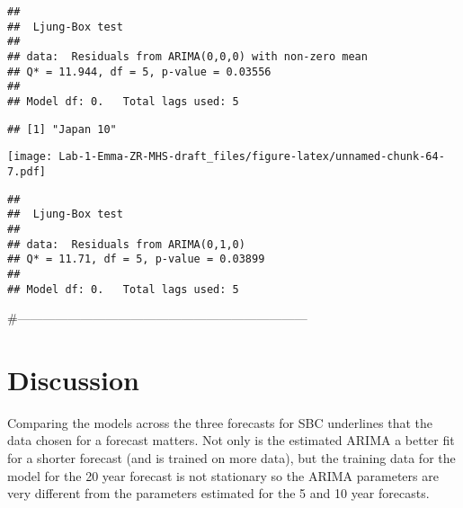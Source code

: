 \documentclass[
]{article}
\newenvironment{Shaded}{\begin{snugshade}}{\end{snugshade}}
\newcommand{\CommentTok}[1]{\textcolor[rgb]{0.56,0.35,0.01}{\textit{#1}}}
\newcommand{\ControlFlowTok}[1]{\textcolor[rgb]{0.13,0.29,0.53}{\textbf{#1}}}
\newcommand{\DecValTok}[1]{\textcolor[rgb]{0.00,0.00,0.81}{#1}}
\newcommand{\FunctionTok}[1]{\textcolor[rgb]{0.00,0.00,0.00}{#1}}
\newcommand{\NormalTok}[1]{#1}
\newcommand{\OtherTok}[1]{\textcolor[rgb]{0.56,0.35,0.01}{#1}}
\newcommand{\SpecialCharTok}[1]{\textcolor[rgb]{0.00,0.00,0.00}{#1}}
\begin{document}
\begin{verbatim}
## 
##  Ljung-Box test
## 
## data:  Residuals from ARIMA(0,0,0) with non-zero mean
## Q* = 11.944, df = 5, p-value = 0.03556
## 
## Model df: 0.   Total lags used: 5
\end{verbatim}

\begin{Shaded}
\end{Shaded}

\begin{verbatim}
## [1] "Japan 10"
\end{verbatim}

\texttt{[image: Lab-1-Emma-ZR-MHS-draft\_files/figure-latex/unnamed-chunk-64-7.pdf]}

\begin{verbatim}
## 
##  Ljung-Box test
## 
## data:  Residuals from ARIMA(0,1,0)
## Q* = 11.71, df = 5, p-value = 0.03899
## 
## Model df: 0.   Total lags used: 5
\end{verbatim}

\#---------------------------------------------------------------------

\hypertarget{discussion}{%
\section{Discussion}\label{discussion}}

Comparing the models across the three forecasts for SBC underlines that
the data chosen for a forecast matters. Not only is the estimated ARIMA
a better fit for a shorter forecast (and is trained on more data), but
the training data for the model for the 20 year forecast is not
stationary so the ARIMA parameters are very different from the
parameters estimated for the 5 and 10 year forecasts.
\end{document}
